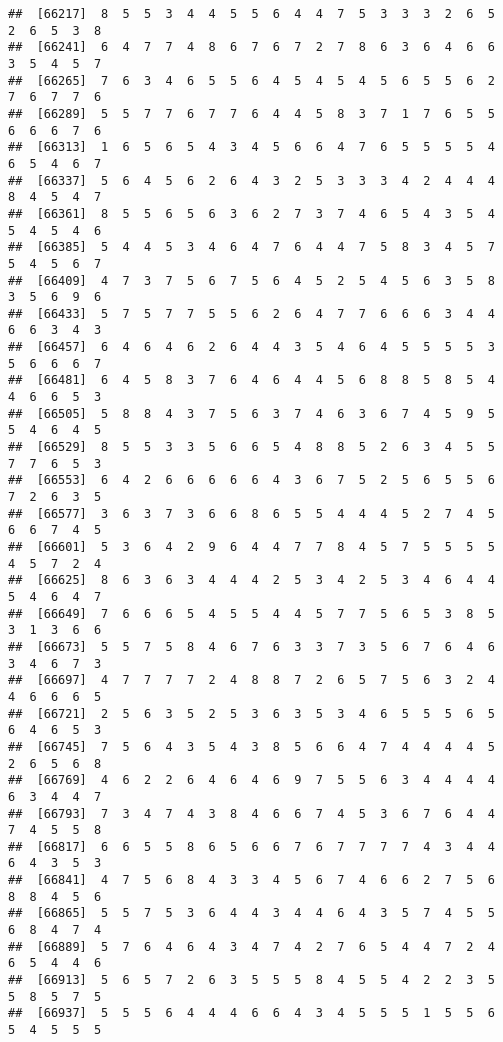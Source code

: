 \documentclass[
]{book}
\begin{document}
\begin{verbatim}
##  [66217]  8  5  5  3  4  4  5  5  6  4  4  7  5  3  3  3  2  6  5  2  6  5  3  8
##  [66241]  6  4  7  7  4  8  6  7  6  7  2  7  8  6  3  6  4  6  6  3  5  4  5  7
##  [66265]  7  6  3  4  6  5  5  6  4  5  4  5  4  5  6  5  5  6  2  7  6  7  7  6
##  [66289]  5  5  7  7  6  7  7  6  4  4  5  8  3  7  1  7  6  5  5  6  6  6  7  6
##  [66313]  1  6  5  6  5  4  3  4  5  6  6  4  7  6  5  5  5  5  4  6  5  4  6  7
##  [66337]  5  6  4  5  6  2  6  4  3  2  5  3  3  3  4  2  4  4  4  8  4  5  4  7
##  [66361]  8  5  5  6  5  6  3  6  2  7  3  7  4  6  5  4  3  5  4  5  4  5  4  6
##  [66385]  5  4  4  5  3  4  6  4  7  6  4  4  7  5  8  3  4  5  7  5  4  5  6  7
##  [66409]  4  7  3  7  5  6  7  5  6  4  5  2  5  4  5  6  3  5  8  3  5  6  9  6
##  [66433]  5  7  5  7  7  5  5  6  2  6  4  7  7  6  6  6  3  4  4  6  6  3  4  3
##  [66457]  6  4  6  4  6  2  6  4  4  3  5  4  6  4  5  5  5  5  3  5  6  6  6  7
##  [66481]  6  4  5  8  3  7  6  4  6  4  4  5  6  8  8  5  8  5  4  4  6  6  5  3
##  [66505]  5  8  8  4  3  7  5  6  3  7  4  6  3  6  7  4  5  9  5  5  4  6  4  5
##  [66529]  8  5  5  3  3  5  6  6  5  4  8  8  5  2  6  3  4  5  5  7  7  6  5  3
##  [66553]  6  4  2  6  6  6  6  6  4  3  6  7  5  2  5  6  5  5  6  7  2  6  3  5
##  [66577]  3  6  3  7  3  6  6  8  6  5  5  4  4  4  5  2  7  4  5  6  6  7  4  5
##  [66601]  5  3  6  4  2  9  6  4  4  7  7  8  4  5  7  5  5  5  5  4  5  7  2  4
##  [66625]  8  6  3  6  3  4  4  4  2  5  3  4  2  5  3  4  6  4  4  5  4  6  4  7
##  [66649]  7  6  6  6  5  4  5  5  4  4  5  7  7  5  6  5  3  8  5  3  1  3  6  6
##  [66673]  5  5  7  5  8  4  6  7  6  3  3  7  3  5  6  7  6  4  6  3  4  6  7  3
##  [66697]  4  7  7  7  7  2  4  8  8  7  2  6  5  7  5  6  3  2  4  4  6  6  6  5
##  [66721]  2  5  6  3  5  2  5  3  6  3  5  3  4  6  5  5  5  6  5  6  4  6  5  3
##  [66745]  7  5  6  4  3  5  4  3  8  5  6  6  4  7  4  4  4  4  5  2  6  5  6  8
##  [66769]  4  6  2  2  6  4  6  4  6  9  7  5  5  6  3  4  4  4  4  6  3  4  4  7
##  [66793]  7  3  4  7  4  3  8  4  6  6  7  4  5  3  6  7  6  4  4  7  4  5  5  8
##  [66817]  6  6  5  5  8  6  5  6  6  7  6  7  7  7  7  4  3  4  4  6  4  3  5  3
##  [66841]  4  7  5  6  8  4  3  3  4  5  6  7  4  6  6  2  7  5  6  8  8  4  5  6
##  [66865]  5  5  7  5  3  6  4  4  3  4  4  6  4  3  5  7  4  5  5  6  8  4  7  4
##  [66889]  5  7  6  4  6  4  3  4  7  4  2  7  6  5  4  4  7  2  4  6  5  4  4  6
##  [66913]  5  6  5  7  2  6  3  5  5  5  8  4  5  5  4  2  2  3  5  5  8  5  7  5
##  [66937]  5  5  5  6  4  4  4  6  6  4  3  4  5  5  5  1  5  5  6  5  4  5  5  5

\end{verbatim}
\end{document}
